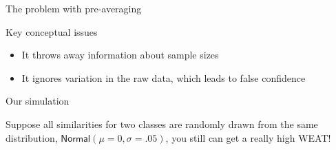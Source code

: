 \documentclass[10pt,ignorenonframetext,x11names, dvipsnames, bibspacing,natbib]{beamer}
\providecommand{\tightlist}{%
  \setlength{\itemsep}{0pt}\setlength{\parskip}{0pt}}
\begin{document}
\begin{frame}{The problem with pre-averaging}
\protect\hypertarget{the-problem-with-pre-averaging}{}

\begin{block}{Key conceptual issues}

\begin{itemize}
\tightlist
\item
  It throws away information about sample sizes
\item
  It ignores variation in the raw data, which leads to false confidence
\end{itemize}

\pause

\end{block}

\begin{block}{Our simulation}

Suppose all similarities for two classes are randomly drawn from the
same distribution, \(\mathsf{Normal}(\mu = 0, \sigma = .05)\), you still
can get a really high WEAT!

\end{block}

\end{frame}
\end{document}
